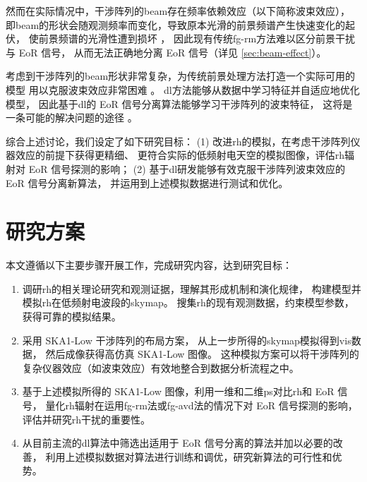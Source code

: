 \begin{itemize}
\hspace{2\ccwd}%
然而在实际情况中，干涉阵列的\ac{beam}存在频率依赖效应（以下简称波束效应），
即\ac{beam}的形状会随观测频率而变化，导致原本光滑的前景频谱产生快速变化的起伏，
使前景频谱的光滑性遭到损坏 \cite{liu2009ps}，
因此现有传统\ac{fg-rm}方法难以区分前景干扰与 EoR 信号，
从而无法正确地分离 EoR 信号（详见 \autoref{sec:beam-effect}）。

\hspace{2\ccwd}%
考虑到干涉阵列的\ac{beam}形状非常复杂，为传统前景处理方法打造一个实际可用的模型
用以克服波束效应非常困难 \cite{lochner2015}。
\ac{dl}方法能够从数据中学习特征并自适应地优化模型，
因此基于\ac{dl}的 EoR 信号分离算法能够学习干涉阵列的波束特征，
这将是一条可能的解决问题的途径 \cite{herbel2018,vafaeiSadr2019}。

\end{itemize}

综合上述讨论，我们设定了如下研究目标：
(1) 改进\ac{rh}的模拟，在考虑干涉阵列仪器效应的前提下获得更精细、
更符合实际的低频射电天空的模拟图像，评估\ac{rh}辐射对 EoR 信号探测的影响；
(2) 基于\ac{dl}研发能够有效克服干涉阵列波束效应的 EoR 信号分离新算法，
并运用到上述模拟数据进行测试和优化。


\section{研究方案}

本文遵循以下主要步骤开展工作，完成研究内容，达到研究目标：
\begin{enumerate}
\item
调研\ac{rh}的相关理论研究和观测证据，理解其形成机制和演化规律，
构建模型并模拟\ac{rh}在低频射电波段的\ac{skymap}。
搜集\ac{rh}的现有观测数据，约束模型参数，获得可靠的模拟结果。

\item
采用 SKA1-Low 干涉阵列的布局方案，
从上一步所得的\ac{skymap}模拟得到\ac{vis}数据，
然后成像获得高仿真 SKA1-Low 图像。
这种模拟方案可以将干涉阵列的复杂仪器效应（如波束效应）有效地整合到数据分析流程之中。

\item
基于上述模拟所得的 SKA1-Low 图像，利用一维和二维\ac{ps}对比\ac{rh}和 EoR 信号，
量化\ac{rh}辐射在运用\ac{fg-rm}法或\ac{fg-avd}法的情况下对 EoR 信号探测的影响，
评估并研究\ac{rh}干扰的重要性。

\item
从目前主流的\ac{dl}算法中筛选出适用于 EoR 信号分离的算法并加以必要的改善，
利用上述模拟数据对算法进行训练和调优，研究新算法的可行性和优势。

\end{enumerate}


